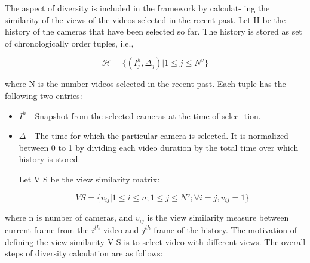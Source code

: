 \documentclass{new}
\begin{document}
The aspect of diversity is included in the framework by calculat-
ing the similarity of the views of the videos selected in the recent
past. Let H be the history of the cameras that have been selected
so far. The history is stored as set of chronologically order tuples,
i.e.,

\begin{equation}
    \mathcal{H} = \{(I_{j}^{h} , \Delta _j )|1 \leq j \leq N^v\}
\end{equation}

where N is the number videos selected in the recent past. Each
tuple has the following two entries:

\begin{itemize}
\item $I^h$ - Snapshot from the selected cameras at the time of selec-
tion.

\item $\Delta$ - The time for which the particular camera is selected. It
is normalized between 0 to 1 by dividing each video duration
by the total time over which history is stored.

Let V S be the view similarity matrix:

\begin{equation}
    V S = \{v_{ij} |1 \leq i \leq n; 1 \leq j \leq N^v; \forall i = j, v_{ij} = 1\}
\end{equation}
\end{itemize}

where n is number of cameras, and $v_{ij}$ is the view similarity
measure between current frame from the $i^{th}$ video and $j^{th}$ frame
of the history. The motivation of defining the view similarity V S is
to select video with different views. The overall steps of diversity
calculation are as follows:
\end{document}
